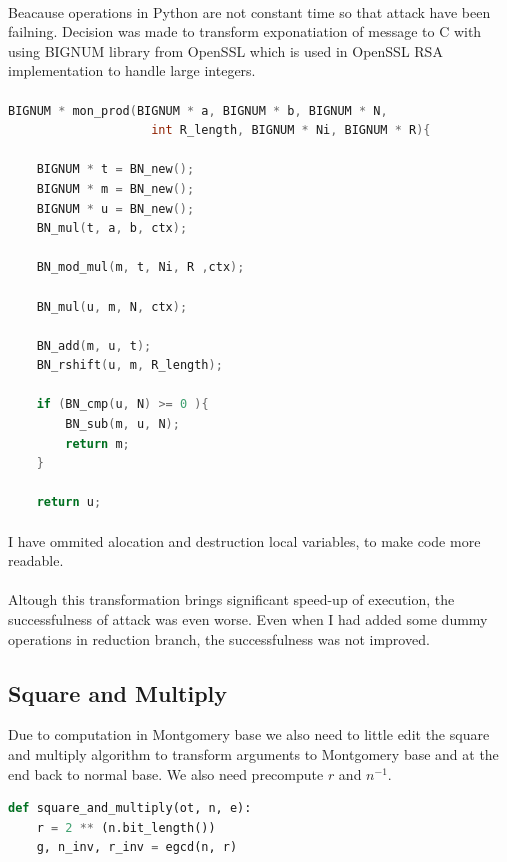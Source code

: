 \documentclass[thesis=B,english]{FITthesis}[2012/10/20]
\begin{document}
{{\paragraph*{}{
Beacause operations in Python are not constant time so that attack have been failning. Decision was made to transform exponatiation of message to C with using BIGNUM library from OpenSSL which is used in OpenSSL RSA implementation to handle large integers.
}

\paragraph*{}
\begin{minipage}{\linewidth}

\begin{lstlisting}[language=C]
BIGNUM * mon_prod(BIGNUM * a, BIGNUM * b, BIGNUM * N, 
                    int R_length, BIGNUM * Ni, BIGNUM * R){
                    
    BIGNUM * t = BN_new();
    BIGNUM * m = BN_new();
    BIGNUM * u = BN_new();
    BN_mul(t, a, b, ctx);

    BN_mod_mul(m, t, Ni, R ,ctx);

    BN_mul(u, m, N, ctx);

    BN_add(m, u, t);
    BN_rshift(u, m, R_length);

    if (BN_cmp(u, N) >= 0 ){
        BN_sub(m, u, N);
        return m;
    }
    
    return u;
\end{lstlisting}
\end{minipage}

\paragraph*{}{
I have ommited alocation and destruction local variables, to make code more readable.
}
\paragraph*{}{
Altough this transformation brings significant speed-up of execution, the successfulness of attack was even worse. Even when I had added some dummy operations in reduction branch, the successfulness was not improved.
}


\subsection{Square and Multiply}{
Due to computation in Montgomery base we also need to little edit the square and multiply algorithm to transform arguments to Montgomery base and at the end back to normal base.
We also need precompute \(r\) and \(n^{-1}\).
}
\begin{minipage}{\linewidth}
\begin{lstlisting}[language=Python]
 def square_and_multiply(ot, n, e):
    r = 2 ** (n.bit_length())
    g, n_inv, r_inv = egcd(n, r)


\end{lstlisting}
\end{minipage}}}
\end{document}

